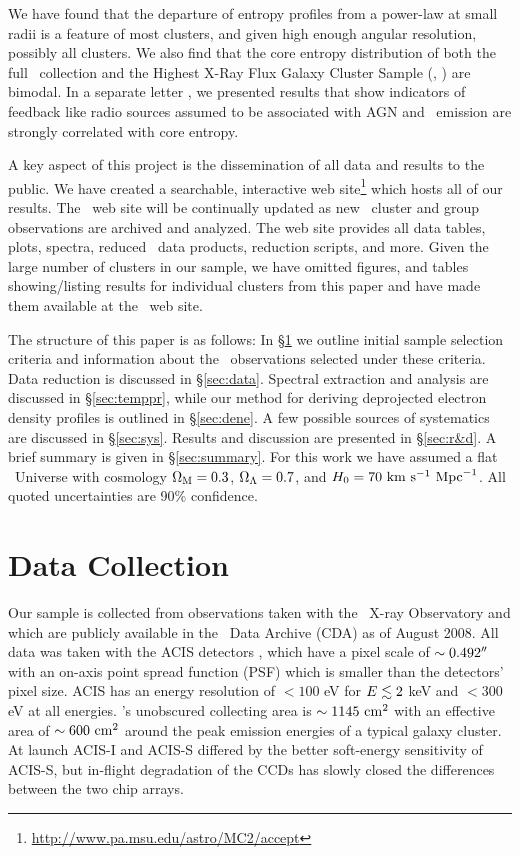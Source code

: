 \documentclass[12pt,preprint]{aastex}
\begin{document}
We have found that the departure of entropy profiles from a power-law
at small radii is a feature of most clusters, and given high enough
angular resolution, possibly all clusters. We also find that the core
entropy distribution of both the full \accept\ collection and the
Highest X-Ray Flux Galaxy Cluster Sample (\hifl, \citealt{hiflugcs1,
  hiflugcs2}) are bimodal. In a separate letter \citep{haradent}, we
presented results that show indicators of feedback like radio sources
assumed to be associated with AGN and \halpha\ emission are strongly
correlated with core entropy.

A key aspect of this project is the dissemination of all data and
results to the public. We have created a searchable, interactive web
site\footnote{\url{http://www.pa.msu.edu/astro/MC2/accept}} which
hosts all of our results. The \accept\ web site will be continually
updated as new \chandra\ cluster and group observations are archived
and analyzed. The web site provides all data tables, plots, spectra,
reduced \chandra\ data products, reduction scripts, and more. Given
the large number of clusters in our sample, we have omitted figures,
and tables showing/listing results for individual clusters from this
paper and have made them available at the \accept\ web site.

The structure of this paper is as follows: In \S\ref{sec:sample} we
outline initial sample selection criteria and information about the
\chandra\ observations selected under these criteria. Data reduction
is discussed in \S\ref{sec:data}. Spectral extraction and analysis are
discussed in \S\ref{sec:temppr}, while our method for deriving
deprojected electron density profiles is outlined in
\S\ref{sec:dene}. A few possible sources of systematics are discussed
in \S\ref{sec:sys}. Results and discussion are presented in
\S\ref{sec:r&d}. A brief summary is given in \S\ref{sec:summary}. For
this work we have assumed a flat \LCDM\ Universe with cosmology
$\Omega_{\mathrm{M}}=0.3$, $\Omega_{\mathrm{\Lambda}}=0.7$, and $H_0=70\mbox{\ensuremath{\mathrm{~km}}}\mathrm{\mbox{\ensuremath{\mathrm{~s}}}^{-1}}\mathrm{\mbox{\ensuremath{\mathrm{~Mpc}}}^{-1}}$. All quoted
uncertainties are 90\% confidence.

\section{Data Collection}
\label{sec:sample}

Our sample is collected from observations taken with the
\chandra\ X-ray Observatory \citep{chandra} and which are publicly
available in the \chandra\ Data Archive (CDA) as of August 2008. All
data was taken with the ACIS detectors \citep{acis}, which have a
pixel scale of $\sim 0.492\mathrm{^\prime}\hskip -0.1em\mathrm{^\prime}$ with an on-axis point spread function
(PSF) which is smaller than the detectors' pixel size. ACIS has an
energy resolution of $< 100$ eV for $E \lesssim 2$ keV and $< 300$ eV at
all energies. \chandra's unobscured collecting area is $\sim 1145
\mathrm{\mbox{\ensuremath{\mathrm{~cm}}}^2}$ with an effective area of $\sim 600 \mathrm{\mbox{\ensuremath{\mathrm{~cm}}}^2}$ around the peak
emission energies of a typical galaxy cluster. At launch ACIS-I and
ACIS-S differed by the better soft-energy sensitivity of ACIS-S, but
in-flight degradation of the CCDs has slowly closed the differences
between the two chip arrays.
\end{document}
